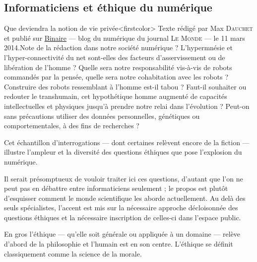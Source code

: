 \subsection[Informaticiens et éthique]{Informaticiens et éthique du numérique}
\label{sub:III.3.2}

Que deviendra la notion de vie privée\caution[t]<firstcolor>{%
\upshape Texte rédigé par Max \textsc{Dauchet} et publié sur \href{https://www.lemonde.fr/blog/binaire/2014/03/11/les-informaticiens-et-lethique-du-numerique/}{Binaire} --- blog du numérique du journal \textsc{Le Monde} --- le 11 mars 2014.}{\upshape Note de la rédaction}
 dans notre société numérique ? L’hypermnésie et l’hyper-connectivité du net sont-elles des facteurs d’asservissement ou de libération de l’homme ? Quelle sera notre responsabilité vis-à-vis de robots commandés par la pensée, quelle sera notre cohabitation avec les robots ? Construire des robots ressemblant à l’homme est-il tabou ? Faut-il souhaiter ou redouter le transhumain, cet hypothétique homme augmenté de capacités intellectuelles et physiques jusqu’à prendre notre relai dans l’évolution ? Peut-on sans précautions utiliser des données personnelles, génétiques ou comportementales, à des fins de recherches ?

Cet échantillon d’interrogations --- dont certaines relèvent encore de la fiction --- illustre l’ampleur et la diversité des questions éthiques que pose l’explosion du numérique.

Il serait présomptueux de vouloir traiter ici ces questions, d’autant que l’on ne peut pas en débattre entre informaticiens seulement ; le propos est plutôt d’esquisser comment le monde scientifique les aborde actuellement. Au delà des seuls spécialistes, l’accent est mis sur la nécessaire approche décloisonnée des questions éthiques et la nécessaire inscription de celles-ci dans l’espace public.


En gros l’éthique --- qu’elle soit générale ou appliquée à un domaine --- relève d’abord de la philosophie et l’humain est en son centre. L’éthique se définit classiquement comme la science de la morale.

